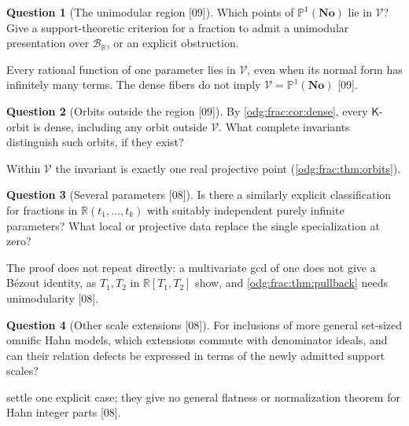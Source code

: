 \documentclass[11pt,oneside]{article}
\numberwithin{equation}{section}
\theoremstyle{definition}
\newtheorem{question}[question]{Question}
\theoremstyle{remark}
\newcommand{\No}{\mathbf{No}}
\newcommand{\R}{\mathbb R}
\newcommand{\BR}{\mathcal B_{\R}}
\newcommand{\src}[1]{\textup{\textsf{\small[#1]}}}
\newcommand{\Vreg}{\mathcal V}
\newcommand{\Kcong}{\mathsf K}
\begin{document}
\begin{question}[The unimodular region \src{09}]\label{odg:frac:q:region}
Which points of $\mathbb P^1(\No)$ lie in $\Vreg$? Give a support-theoretic
criterion for a fraction to admit a unimodular presentation over $\BR$, or an
explicit obstruction.
\end{question}
Every rational function of one parameter lies in $\Vreg$, even when its normal
form has infinitely many terms. The dense fibers do not imply
$\Vreg=\mathbb P^1(\No)$ \src{09}.

\begin{question}[Orbits outside the region \src{09}]\label{odg:frac:q:orbits}
By \cref{odg:frac:cor:dense}, every $\Kcong$-orbit is dense, including any orbit
outside $\Vreg$. What complete invariants distinguish such orbits, if they exist?
\end{question}
Within $\Vreg$ the invariant is exactly one real projective point
(\cref{odg:frac:thm:orbits}).

\begin{question}[Several parameters \src{08}]\label{odg:frac:q:parameters}
Is there a similarly explicit classification for fractions in
$\R(t_1,\ldots,t_k)$ with suitably independent purely infinite parameters? What
local or projective data replace the single specialization at zero?
\end{question}
The proof does not repeat directly: a multivariate gcd of one does not give a
B\'ezout identity, as $T_1,T_2$ in $\R[T_1,T_2]$ show, and
\cref{odg:frac:thm:pullback} needs unimodularity \src{08}.

\begin{question}[Other scale extensions \src{08}]\label{odg:frac:q:scales}
For inclusions of more general set-sized omnific Hahn models, which extensions
commute with denominator ideals, and can their relation defects be expressed in
terms of the newly admitted support scales?
\end{question}
 settle one explicit case; they give
no general flatness or normalization theorem for Hahn integer parts \src{08}.
\end{document}
